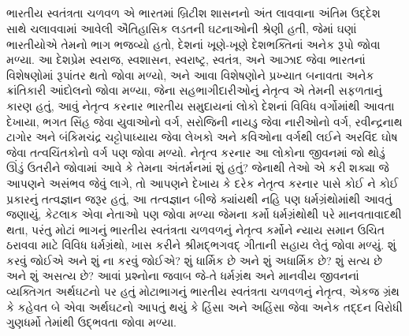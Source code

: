 \documentclass[a4paper]{article}
\begin{document}
\subsection{}

\begin{Guja}
ભારતીય સ્વતંત્રતા ચળવળ એ ભારતમાં બ્રિટીશ શાસનનો અંત લાવવાના અંતિમ ઉદ્દેશ સાથે ચલાવવામાં આવેલી ઐતિહાસિક લડતની ઘટનાઓની શ્રેણી હતી, જેમાં ઘણાં ભારતીયોએ તેમનો ભાગ ભજવ્યો હતો, 
દેશનાં ખૂણે-ખૂણે દેશભક્તિનાં અનેક રૂપો જોવા મળ્યા. આ દેશપ્રેમ સ્વરાજ, સ્વશાસન, સ્વરાષ્ટ્ર, સ્વતંત્ર, અને આઝાદ જેવા ભારતનાં વિશેષણોમાં રૂપાંતર થતો જોવા મળ્યો, અને આવા વિશેષણોને પ્રખ્યાત 
બનાવતા અનેક ક્રાંતિકારી આંદોલનો જોવા મળ્યા, જેના સહભાગીદારીઓનું નેતૃત્વ એ તેમની સફળતાનું કારણ હતું, આવું નેતૃત્વ કરનાર ભારતીય સમુદાયનાં લોકો દેશનાં વિવિધ વર્ગોમાંથી આવતા દેખાયા, ભગત સિંહ 
જેવા યુવાઓનો વર્ગ, સરોજિની નાયડુ જેવા નારીઓનો વર્ગ,  રવીન્દ્રનાથ ટાગોર અને બંકિમચંદ્ર ચટ્ટોપાધ્યાય જેવા લેખકો અને કવિઓના વર્ગથી લઈને અરવિંદ ઘોષ જેવા તત્વચિંતકોનો વર્ગ પણ જોવા મળ્યો. નેતૃત્વ 
કરનાર આ લોકોના જીવનમાં જો થોડું ઊંડું ઉતરીને જોવામાં આવે કે તેમના અંતર્મનમાં શું હતું? જેનાથી તેઓ એ કરી શક્યા જે આપણને અસંભવ જેવું લાગે, તો આપણને દેખાય કે દરેક નેતૃત્વ કરનાર પાસે કોઈ ને કોઈ 
પ્રકારનું તત્વજ્ઞાન જરૂર હતું, આ તત્વજ્ઞાન બીજે ક્યાંયથી નહિ પણ ધર્મગ્રંથોમાંથી આવતું જણાયું, કેટલાક એવા નેતાઓ પણ જોવા મળ્યા જેમના કર્મો ધર્મગ્રંથોથી પરે માનવતાવાદથી થતા, પરંતુ મોટાં ભાગનું ભારતીય 
સ્વતંત્રતા ચળવળનું નેતૃત્વ કર્મોને ન્યાય સમાન ઉચિત ઠરાવવા માટે વિવિધ ધર્મગ્રંથો, ખાસ કરીને શ્રીમદ્ભગવદ્ ગીતાની સહાય લેતું જોવા મળ્યું. શું કરવું જોઈએ અને શું ના કરવું જોઈએ? શું ધાર્મિક છે અને શું અધાર્મિક છે? 
શું સત્ય છે અને શું અસત્ય છે? આવાં પ્રશ્નોના જવાબ જે-તે ધર્મગ્રંથ અને માનવીય જીવનનાં વ્યક્તિગત અર્થઘટનો પર હતું મોટાભાગનું ભારતીય સ્વતંત્રતા ચળવળનું નેતૃત્વ, એકજ ગ્રંથ કે કહેવત બે એવા અર્થઘટનો આપતું 
થયું કે હિંસા અને અહિંસા જેવા અનેક તદ્દન વિરોધી ગુણધર્મો તેમાંથી ઉદ્ભવતા જોવા મળ્યા.


\end{Guja}
\end{document}
